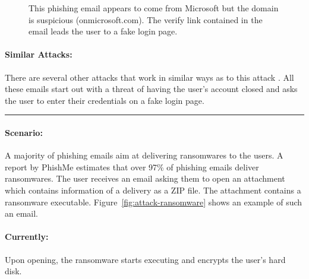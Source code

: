 \afterpage{\clearpage}
\begin{figure}[p]
\centering
    \caption{This phishing email appears to come from Microsoft but the domain is suspicious (onmicrosoft.com). The verify link contained in the email leads the user to a fake login page.}
   \label{fig:attack-verify-email}
\end{figure}

\paragraph{Similar Attacks:} There are several other attacks that work in similar ways as to this attack \cite{attack-verify-email-1}\cite{attack-verify-email-2}\cite{attack-verify-email-3}. All these emails start out with a threat of having the user's account closed and asks the user to enter their credentials on a fake login page.

\noindent\rule[0.5ex]{\linewidth}{1pt}

\paragraph{Scenario:} A majority of phishing emails aim at delivering ransomwares to the users. A report by PhishMe estimates that over 97\% of phishing emails deliver ransomwares. The user receives an email asking them to open an attachment which contains information of a delivery as a ZIP file. The attachment contains a ransomware executable. Figure~\ref{fig:attack-ransomware} shows an example of such an email.

\paragraph{Currently:} Upon opening, the ransomware starts executing and encrypts the user's hard disk.

